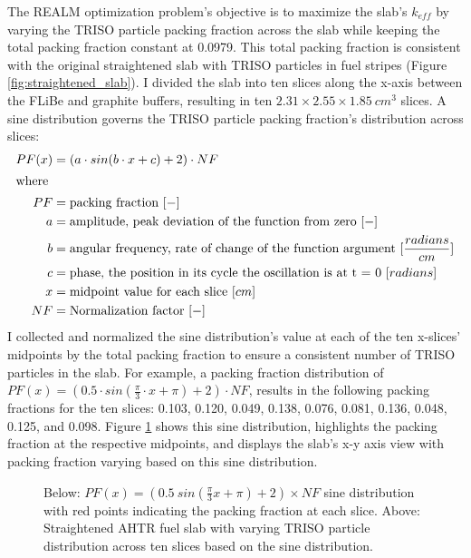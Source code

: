 The \gls{REALM} optimization problem's objective is to maximize the slab's 
$k_{eff}$ by varying the \gls{TRISO} particle packing fraction across the slab
while keeping the total packing fraction constant at 0.0979. 
This total packing fraction is consistent with the original straightened slab with 
TRISO particles in fuel stripes (Figure \ref{fig:straightened_slab}). 
I divided the slab into ten slices along the x-axis between the \gls{FLiBe} and 
graphite buffers, resulting in ten $2.31 \times 2.55 \times 1.85\ cm^3$ slices. 
A sine distribution governs the \gls{TRISO} particle packing fraction's 
distribution across slices:
\begin{align}
    PF(x) &= \left(a\cdot sin(b\cdot x + c) + 2\right) \cdot NF\\
    \intertext{where}
    PF &= \mbox{packing fraction } [-] \nonumber \\ 
    a &= \mbox{amplitude, peak deviation of the function from zero } [-] \nonumber \\
    b &= \mbox{angular frequency, rate of change of the function argument } [\frac{radians}{cm}] \nonumber \\
    c &= \mbox{phase, the position in its cycle the oscillation is at t = 0 } [radians]\nonumber \\
    x &= \mbox{midpoint value for each slice } [cm]\nonumber \\
    NF &= \mbox{Normalization factor } [-]\nonumber
\end{align}
I collected and normalized the sine distribution's value at each of the ten 
x-slices' midpoints by the total packing fraction to ensure a consistent number 
of \gls{TRISO} particles in the slab.
For example, a packing fraction distribution of 
$PF(x) = \left(0.5\cdot sin(\frac{\pi}{3}\cdot x + \pi) + 2\right)  \cdot NF$, 
results in the following packing fractions for the ten slices: 0.103, 0.120, 
0.049, 0.138, 0.076, 0.081, 0.136, 0.048, 0.125, and 0.098. 
Figure \ref{fig:triso_distribution} shows this sine distribution, highlights 
the packing fraction at the respective midpoints, and displays the slab's x-y 
axis view with packing fraction varying based on this sine distribution. 
\begin{figure}[]
    \centering
    \caption{Below: $PF(x) = (0.5\ sin(\frac{\pi}{3}x + \pi) + 2)  \times NF$ 
    sine distribution with red points indicating the packing fraction at each slice. 
    Above: Straightened \acrfull{AHTR} fuel slab with varying \gls{TRISO} particle 
    distribution across ten slices based on the sine distribution. }
    \label{fig:triso_distribution}
\end{figure}

